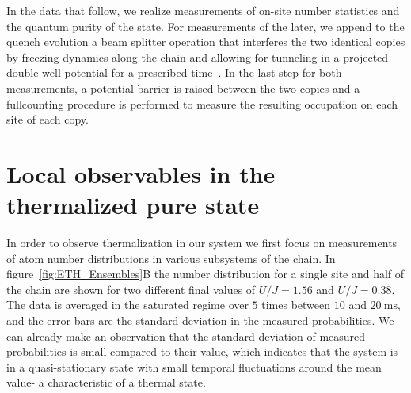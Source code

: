In the data that follow, we realize measurements of on-site number statistics and the quantum purity of the state. For measurements of the later, we append to the quench evolution a beam splitter operation that interferes the two
identical copies by freezing dynamics along the chain and allowing for tunneling in a projected double-well potential for a prescribed time~\cite{Islam2015}. In the last step for both measurements, a potential barrier is raised between the two copies and a fullcounting procedure is performed to measure the resulting occupation on each site of each copy.

\section{Local observables in the thermalized pure state}

In order to observe thermalization in our system we first focus on measurements of atom number distributions in various subsystems of the chain. In figure~\ref{fig:ETH_Ensembles}B the number distribution for a single site and half of the chain are shown for two different final values of $U/J = 1.56$ and $U/J =0.38$. The data is averaged in the saturated regime over $5$ times between $10$ and $20~\mathrm{ms}$, and the error bars are the standard deviation in the measured probabilities. We can already make an observation that the standard deviation of measured probabilities is small compared to their value, which indicates that the system is in a quasi-stationary state with small temporal fluctuations around the mean value- a characteristic of a thermal state.


